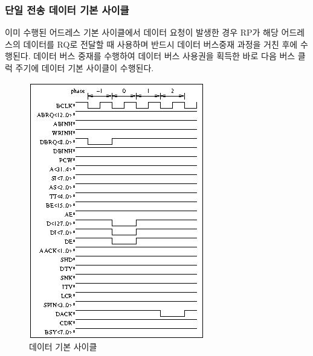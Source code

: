 \subsubsection{단일 전송 데이터 기본 사이클}
이미 수행된 어드레스 기본 사이클에서 데이터 요청이 발생한 경우 RP가 해당 어드레스의 데이터를
RQ로 전달할 때 사용하며 반드시 데이터 버스중재 과정을 거친 후에 수행된다.
데이터 버스 중재를 수행하여 데이터 버스 사용권을 획득한 바로 다음 버스 클럭 주기에
데이터 기본 사이클이 수행된다.
%
\begin{figure}[hp]
   \centerline{\includegraphics{ch3/FIG/single-data-basic.jpg}}
   \caption{데이터 기본 사이클}\label{figure:single-data-basic}
\end{figure}

